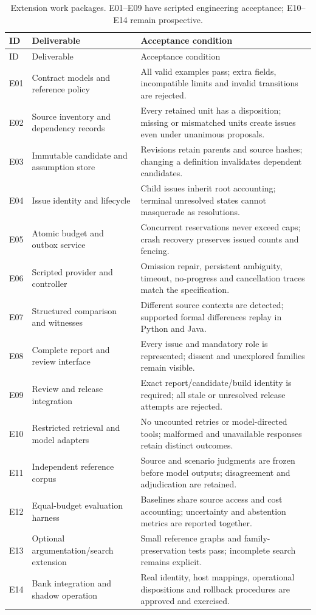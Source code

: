 \documentclass[12pt,a4paper,oneside,openany]{book}
\begin{document}
\begin{longtable}{P{13mm}P{49mm}P{85mm}}
\caption{Extension work packages. E01--E09 have scripted engineering acceptance;
E10--E14 remain prospective.}\label{tab:extension-tasks}\\
\toprule
ID & Deliverable & Acceptance condition\\\midrule\endfirsthead
\toprule ID & Deliverable & Acceptance condition\\\midrule\endhead
E01 & Contract models and reference policy & All valid examples pass; extra fields, incompatible limits and invalid transitions are rejected.\\
E02 & Source inventory and dependency records & Every retained unit has a disposition; missing or mismatched units create issues even under unanimous proposals.\\
E03 & Immutable candidate and assumption store & Revisions retain parents and source hashes; changing a definition invalidates dependent candidates.\\
E04 & Issue identity and lifecycle & Child issues inherit root accounting; terminal unresolved states cannot masquerade as resolutions.\\
E05 & Atomic budget and outbox service & Concurrent reservations never exceed caps; crash recovery preserves issued counts and fencing.\\
E06 & Scripted provider and controller & Omission repair, persistent ambiguity, timeout, no-progress and cancellation traces match the specification.\\
E07 & Structured comparison and witnesses & Different source contexts are detected; supported formal differences replay in Python and Java.\\
E08 & Complete report and review interface & Every issue and mandatory role is represented; dissent and unexplored families remain visible.\\
E09 & Review and release integration & Exact report/candidate/build identity is required; all stale or unresolved release attempts are rejected.\\
E10 & Restricted retrieval and model adapters & No uncounted retries or model-directed tools; malformed and unavailable responses retain distinct outcomes.\\
E11 & Independent reference corpus & Source and scenario judgments are frozen before model outputs; disagreement and adjudication are retained.\\
E12 & Equal-budget evaluation harness & Baselines share source access and cost accounting; uncertainty and abstention metrics are reported together.\\
E13 & Optional argumentation/search extension & Small reference graphs and family-preservation tests pass; incomplete search remains explicit.\\
E14 & Bank integration and shadow operation & Real identity, host mappings, operational dispositions and rollback procedures are approved and exercised.\\
\bottomrule
\end{longtable}
\end{document}
